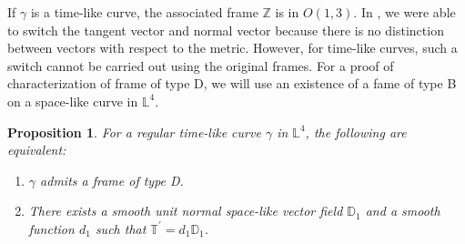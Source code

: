 \documentclass[a4paper]{amsart}
\newtheorem{proposition}[theorem]{Proposition}
\theoremstyle{definition}
\theoremstyle{remark}
\newcommand{\ZZ}{\mathbb{Z}}
\newcommand{\LL}{\mathbb{L}}
\numberwithin{equation}{section}
\begin{document}
If $\gamma$ is a time-like curve, the associated frame $\ZZ$ is in $O(1, 3)$. In \cite{NN}, we were able to switch the tangent vector and normal vector because there is no distinction between vectors with respect to the metric. However, for time-like curves, such a switch cannot be carried out using the original frames. For a proof of  characterization of frame of type D, we will use an existence of a fame of type B on a space-like curve in $\LL^{4}$.
\begin{proposition}\label{proposition:1}
For a regular time-like curve $\gamma$ in $\LL^{4}$, the following are equivalent:
\begin{enumerate}
    \item $\gamma$ admits a frame of type D.
    \item There exists a smooth unit normal space-like vector field $\mathbb{D}_{1}$ and a smooth function $d_1$ such that  $\mathbb{T}^{\prime}=d_{1}\mathbb{D}_{1}$.
\end{enumerate}
\end{proposition}
\end{document}
